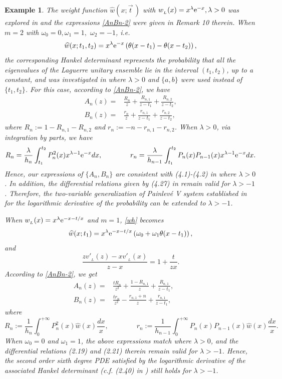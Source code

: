 \documentclass[12pt,a4paper]{article}    %
\newcommand{\e}{{\rm e}}
\newtheorem{exm}{Example}
\numberwithin{equation}{section}
\begin{document}
\begin{exm}	
The weight function $\widehat{w}(x;\vec{t}\,)$ with $w_{_L}(x)=x^{\lambda}\e^{-x},\lambda>0$ was explored in \cite{LyuChenXu2023} and the expressions \eqref{AnBn-2} were given in Remark 10 therein. When $m=2$ with $\omega_0=0,\omega_1=1,$ $\omega_2=-1$, i.e.
\[\widehat{w}(x;t_1,t_2)= x^{\lambda}\e^{-x}\left(\theta (x-t_1)-\theta (x-t_2)\right),\]
the corresponding Hankel determinant represents the probability that all the eigenvalues of the Laguerre unitary ensemble lie in the interval $(t_1,t_2)$, up to a constant, and was investigated in \cite{BasorChenZhang12} where $\lambda>0$ and $\{a,b\}$ were used instead of $\{t_1,t_2\}$. For this case, according to \eqref{AnBn-2}, we have
\begin{align*}		 A_n(z)=&\frac{R_n}{z}+\frac{R_{n,1}}{z-t_1}+\frac{R_{n,2}}{z-t_2},\\		 	 B_n(z)=&\frac{r_n}{z}+\frac{r_{n,1}}{z-t_1}+\frac{r_{n,2}}{z-t_2},
\end{align*}
where $R_n:=1-R_{n,1}-R_{n,2}$ and $r_n:=-n-r_{n,1}-r_{n,2}$. When $\lambda>0$, via integration by parts, we have
\[R_n=\frac{\lambda}{h_n}\int_{t_1}^{t_2}P_n^2(x)x^{\lambda-1}\e^{-x}dx,\qquad\qquad r_n=\frac{\lambda}{h_{n-1}}\int_{t_1}^{t_2}P_n(x)P_{n-1}(x)x^{\lambda-1}\e^{-x}dx.\] Hence, our expressions of $\{A_n,B_n\}$ are consistent with (4.1)-(4.2) in \cite{BasorChenZhang12} where $\lambda>0$. In addition, the differential relations given by (4.27) in \cite{BasorChenZhang12} remain valid for $\lambda>-1$. Therefore, the two-variable generalization of Painlev\'{e} V system established in \cite{BasorChenZhang12} for the logarithmic derivative of the probability can be extended to $\lambda>-1$.

When $w_{_L}(x)=x^{\lambda}\e^{-x-t/x}$ and $m=1$, \eqref{wh} becomes \[\widehat{w}(x;t_1)=x^{\lambda}\e^{-x-t/x}\left(\omega_0+\omega_1\theta(x-t_1)\right),\] and
\[\frac{zv'_{_L}(z)-xv'_{_L}(x)}{z-x}=1+\frac{t}{zx}.\]
 According to \eqref{AnBn-2}, we get
\begin{align*}
A_n(z)=&\frac{tR_n}{z^2}+\frac{1-R_{n,1}}{z}+\frac{R_{n,1}}{z-t_1},\qquad \\ B_n(z)=&\frac{t r_n}{z^2}-\frac{r_{n,1}+n}{z}+\frac{r_{n,1}}{z-t_1},
\end{align*}
where
\[R_n:=\frac{1}{h_n}\int_0^{+\infty}P_n^2(x)\widehat{w}(x)\frac{dx}{x},\qquad\qquad r_n:=\frac{1}{h_{n-1}}\int_0^{+\infty}P_n(x)P_{n-1}(x)\widehat{w}(x)\frac{dx}{x}.\]
When $\omega_0=0$ and $\omega_1=1$, the above expressions match \cite[(2.1)]{LyuGriffinChen2019} where $\lambda>0$, and the differential relations (2.19) and (2.21) therein remain valid for $\lambda>-1$. Hence, the second order sixth degree PDE satisfied by the logarithmic derivative of the associated Hankel determinant (c.f. (2.40) in \cite{LyuGriffinChen2019}) still holds for $\lambda>-1$.
\end{exm}
\end{document}
